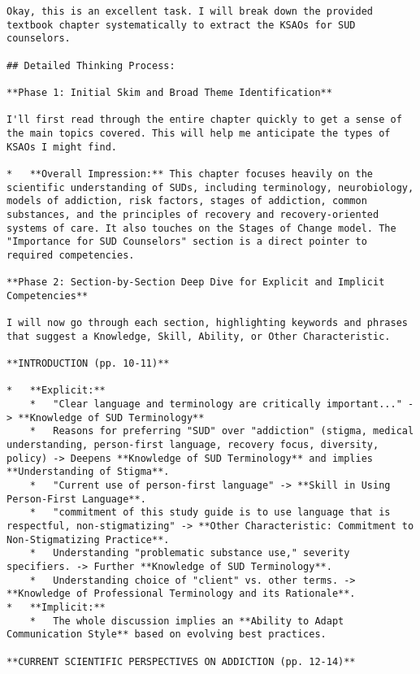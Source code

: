 \documentclass[
  letterpaper,
  DIV=11,
  numbers=noendperiod]{scrartcl}
\begin{document}
\begin{verbatim}
Okay, this is an excellent task. I will break down the provided textbook chapter systematically to extract the KSAOs for SUD counselors.

## Detailed Thinking Process:

**Phase 1: Initial Skim and Broad Theme Identification**

I'll first read through the entire chapter quickly to get a sense of the main topics covered. This will help me anticipate the types of KSAOs I might find.

*   **Overall Impression:** This chapter focuses heavily on the scientific understanding of SUDs, including terminology, neurobiology, models of addiction, risk factors, stages of addiction, common substances, and the principles of recovery and recovery-oriented systems of care. It also touches on the Stages of Change model. The "Importance for SUD Counselors" section is a direct pointer to required competencies.

**Phase 2: Section-by-Section Deep Dive for Explicit and Implicit Competencies**

I will now go through each section, highlighting keywords and phrases that suggest a Knowledge, Skill, Ability, or Other Characteristic.

**INTRODUCTION (pp. 10-11)**

*   **Explicit:**
    *   "Clear language and terminology are critically important..." -> **Knowledge of SUD Terminology**
    *   Reasons for preferring "SUD" over "addiction" (stigma, medical understanding, person-first language, recovery focus, diversity, policy) -> Deepens **Knowledge of SUD Terminology** and implies **Understanding of Stigma**.
    *   "Current use of person-first language" -> **Skill in Using Person-First Language**.
    *   "commitment of this study guide is to use language that is respectful, non-stigmatizing" -> **Other Characteristic: Commitment to Non-Stigmatizing Practice**.
    *   Understanding "problematic substance use," severity specifiers. -> Further **Knowledge of SUD Terminology**.
    *   Understanding choice of "client" vs. other terms. -> **Knowledge of Professional Terminology and its Rationale**.
*   **Implicit:**
    *   The whole discussion implies an **Ability to Adapt Communication Style** based on evolving best practices.

**CURRENT SCIENTIFIC PERSPECTIVES ON ADDICTION (pp. 12-14)**


\end{verbatim}
\end{document}
